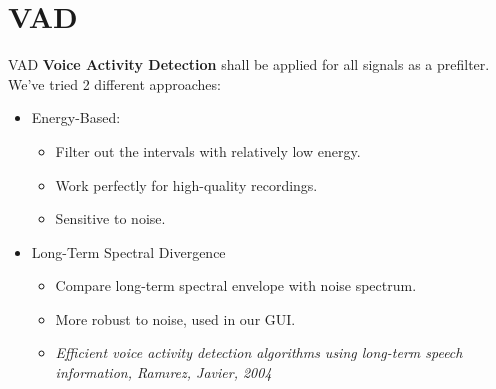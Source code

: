 
\section{VAD}
\begin{frame}{VAD}
  \textbf{Voice Activity Detection} shall be applied for all signals as a prefilter.
  We've tried 2 different approaches:
  \pause
  \begin{itemize}
    \item Energy-Based:
      \begin{itemize}
        \item Filter out the intervals with relatively low energy.
        \item Work perfectly for high-quality recordings.
        \item Sensitive to noise.
      \end{itemize}
      \pause

    \item Long-Term Spectral Divergence
      \begin{itemize}
        \item Compare long-term spectral envelope with noise spectrum.
        \item More robust to noise, used in our GUI.
        \item
            \footnotesize\it\color{red!50!black}
            Efficient voice activity detection algorithms using long-term speech information,
            Ramırez, Javier, 2004
      \end{itemize}
  \end{itemize}
\end{frame}
